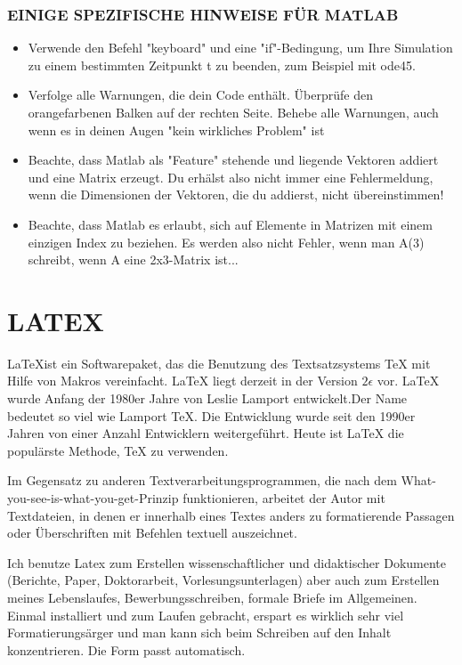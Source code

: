 \subsubsection{EINIGE SPEZIFISCHE HINWEISE FÜR MATLAB}
\begin{itemize}
    \item Verwende den Befehl "keyboard" und eine "if"-Bedingung, um Ihre Simulation zu einem bestimmten Zeitpunkt t zu beenden, zum Beispiel mit ode45. 
\item Verfolge alle Warnungen, die dein Code enthält. Überprüfe den orangefarbenen Balken auf der rechten Seite. Behebe alle Warnungen, auch wenn es in deinen Augen "kein wirkliches Problem" ist
\item Beachte, dass Matlab als "Feature" stehende und liegende Vektoren addiert und eine Matrix erzeugt. Du erhälst also nicht immer eine Fehlermeldung, wenn die Dimensionen der Vektoren, die du addierst, nicht übereinstimmen! 
\item Beachte, dass Matlab es erlaubt, sich auf Elemente in Matrizen mit einem einzigen Index zu beziehen. Es werden also nicht Fehler, wenn man A(3) schreibt, wenn A eine 2x3-Matrix ist...
\end{itemize}





\section{LATEX}

\LaTeX ist ein Softwarepaket, das die Benutzung des Textsatzsystems TeX mit Hilfe von Makros vereinfacht. LaTeX liegt derzeit in der Version $2\epsilon$ vor. LaTeX wurde Anfang der 1980er Jahre von Leslie Lamport entwickelt.Der Name bedeutet so viel wie Lamport TeX. Die Entwicklung wurde seit den 1990er Jahren von einer Anzahl Entwicklern weitergeführt. Heute ist LaTeX die populärste Methode, TeX zu verwenden. 
\cite{wikilatex}

Im Gegensatz zu anderen Textverarbeitungsprogrammen, die nach dem What-you-see-is-what-you-get-Prinzip funktionieren, arbeitet der Autor mit Textdateien, in denen er innerhalb eines Textes anders zu formatierende Passagen oder Überschriften mit Befehlen textuell auszeichnet. 
\cite{wikilatex}

Ich benutze Latex zum Erstellen wissenschaftlicher und didaktischer Dokumente (Berichte, Paper, Doktorarbeit, Vorlesungsunterlagen) aber auch zum Erstellen meines Lebenslaufes, Bewerbungsschreiben, formale Briefe im Allgemeinen. Einmal installiert und zum Laufen gebracht, erspart es wirklich sehr viel Formatierungsärger und man kann sich beim Schreiben auf den Inhalt konzentrieren. Die Form passt automatisch.

